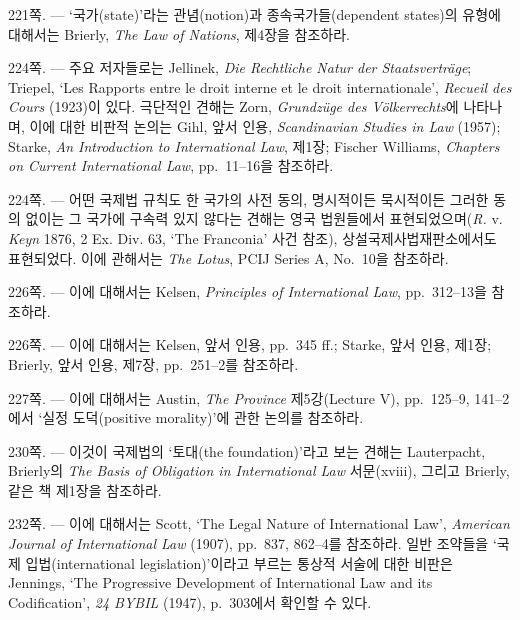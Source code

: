 {\noteentry 221쪽.  --- ‘국가(state)’라는 관념(notion)과
종속국가들(dependent states)의 유형에 대해서는 Brierly, \emph{The Law of
Nations}, 제4장을 참조하라.

\noteentry 224쪽.  --- 주요 저자들로는 Jellinek, \emph{Die Rechtliche Natur der
Staatsverträge}; Triepel, `Les Rapports entre le droit interne et le
droit internationale', \emph{Recueil des Cours} (1923)이 있다. 극단적인
견해는 Zorn, \emph{Grundzüge des Völkerrechts}에 나타나며, 이에 대한
비판적 논의는 Gihl, 앞서 인용, \emph{Scandinavian Studies in Law}
(1957); Starke, \emph{An Introduction to International Law}, 제1장;
Fischer Williams, \emph{Chapters on Current International Law},
pp.~11--16을 참조하라.

\noteentry 224쪽.  --- 어떤 국제법 규칙도
한 국가의 사전 동의, 명시적이든 묵시적이든 그러한 동의 없이는 그 국가에
구속력 있지 않다는 견해는 영국 법원들에서 표현되었으며(\emph{R.} v.
\emph{Keyn} 1876, 2 Ex. Div. 63, `The Franconia' 사건 참조),
상설국제사법재판소에서도 표현되었다. 이에 관해서는 \emph{The Lotus},
PCIJ Series A, No.~10을 참조하라.

\noteentry 226쪽.  --- 이에 대해서는
Kelsen, \emph{Principles of International Law}, pp.~312--13을 참조하라.

\noteentry 226쪽.  ---
이에 대해서는 Kelsen, 앞서 인용, pp.~345 ff.; Starke, 앞서 인용, 제1장;
Brierly, 앞서 인용, 제7장, pp.~251--2를 참조하라.

\noteentry 227쪽.  --- 이에
대해서는 Austin, \emph{The Province} 제5강(Lecture V), pp.~125--9,
141--2에서 ‘실정 도덕(positive morality)’에 관한 논의를 참조하라.

\noteentry 230쪽.  --- 이것이
국제법의 ‘토대(the foundation)’라고 보는 견해는 Lauterpacht, Brierly의
\emph{The Basis of Obligation in International Law} 서문(xviii), 그리고
Brierly, 같은 책 제1장을 참조하라.

\noteentry 232쪽.  --- 이에
대해서는 Scott, `The Legal Nature of International Law', \emph{American
Journal of International Law} (1907), pp.~837, 862--4를 참조하라. 일반
조약들을 ‘국제 입법(international legislation)’이라고 부르는 통상적
서술에 대한 비판은 Jennings, `The Progressive Development of
International Law and its Codification', \emph{24 BYBIL} (1947),
p.~303에서 확인할 수 있다.

}
